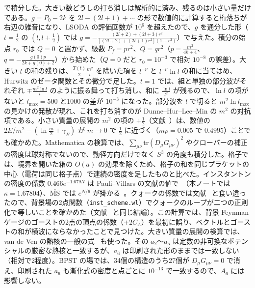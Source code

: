 \documentclass[a4paper,10pt]{ltjsarticle}
\newcommand{\MSbar}{\overline{\mathrm{MS}}}
\newcommand{\tr}{\mathrm{tr}}
\begin{document}
で積分した。大きい数どうしの打ち消しは解析的に済み、残るのは小さい量だけである。$g=P_0-2k$ を $2l-(2l+1)+\cdots$ の形で数値的に計算すると桁落ちが右辺の雑音になり、LSODA の評価回数が $10^6$ を超えたので、$g$ を通分した形（$t=\frac12$ の $(l,l+\frac12)$ では $g=-\frac{(2l+2)+(2l+3)r^2}{[(2l+2)+(2l+1)r^2](1+r^2)}$）で与えた。積分の始点 $r_0$ では $Q=0$ と置かず、級数 $P_f=pr^2$、$Q=qr^2$（$p=\frac{m^2}{4k+4}$、$q=-\frac{g(0)p}{2k+g(0)+2}$）から始めた（$Q=0$ だと $r_0=10^{-3}$ で相対 $10^{-8}$ の誤差）。大きい $l$ の和の残りは、$\frac{T(t)}2\frac{m^2}l$ を除いた項を $l^{-p}$ と $l^{-p}\ln l$ の和に当てはめ、Hurwitz のゼータ関数とその微分で足した。$t=1$ では、組と単独の部分波がそれぞれ $\mp\frac{m^2\ln l}l$ のように振る舞って打ち消し、和に $\frac{\ln l}{l^2}$ が残るので、$\ln l$ の項がないと $l_{\max}=500$ と1000 の差が $10^{-3}$ になった。部分波を $l$ で切ると $m^2\ln l_{\max}$ の見かけの発散が現れ、これを打ち消すのが Dunne--Hur--Lee--Min の $m^2$ の対抗項である。小さい質量の展開の $m^2$ の項の $+\frac12$（文献~\cite{hlm09}）は、数値の $2E/m^2-(\ln\frac m2+\gamma_E)$ が $m\to0$ で $\frac12$ に近づく（$m\rho=0.005$ で $0.4995$）ことでも確かめた。Mathematica の検算では、$\sum_{\mu\nu}\tr(D_\mu G_{\mu\nu})^2$ やクローバーの補正の密度は球対称でないので、動径方向だけでなく $S^3$ の角度も積分した。格子では、境界を開いた箱の $O(a)$ の効果を除くため、格子の和を同じプラケットの中心（電荷は同じ格子点）で連続の密度を足したものと比べた。インスタントンの密度の係数 $0.466e^{-1.679N}$ は Pauli--Villars の文献の値で~\cite{np94}（本ノートでは $\kappa=1.67804$）、$\MSbar$ では $e^{N/6}$ が掛かる~\cite{hh81,np94}。クォークの係数では文献~\cite{bn20,fm25} と食い違ったので、背景場の2点関数（\texttt{inst\_scheme.wl}）でクォークのループが二つの正則化で等しいことを確かめた（文献~\cite{thooft86,np94} と同じ結論）。この計算では、背景 Feynman ゲージのゴーストの2点の頂点の係数（$+2C_A$）を最初に誤り、ベクトルとゴーストの和が横波にならなかったことで見つけた。大きい質量の展開の検算では、van de Ven の熱核の一般の式~\cite{vdv98} も使った。その $a_2$〜$a_5$ は定数の非可換なポテンシャルの厳密な熱核と一致するが、$a_6$ は印刷された形のままでは一致しない（相対で2程度）。BPST の場では、34個の構造のうち27個が $D_\mu G_{\mu\nu}=0$ で消え、印刷された $a_6$ も漸化式の密度と点ごとに $10^{-13}$ で一致するので、$A_6$ には影響しない。
\end{document}
